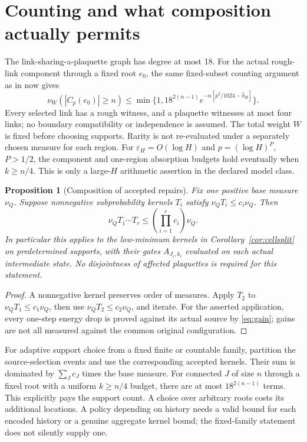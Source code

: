 \documentclass[11pt]{article}
\newtheorem{proposition}[theorem]{Proposition}
\theoremstyle{definition}
\theoremstyle{remark}
\begin{document}
\section{Counting and what composition actually permits}
The link-sharing-a-plaquette graph has degree at most 18. For the actual
rough-link component through a fixed root $e_0$, the same fixed-subset
counting argument as in \cite{third} now gives
\begin{equation}
 \nu_W(|C_p(e_0)|\ge n)
 \le\min\{1,18^{2(n-1)}e^{-n[p^2/1024-\widehat b_H]}\}.
 \label{eq:components}
\end{equation}
Every selected link has a rough witness, and a plaquette witnesses at
most four links; no boundary compatibility or independence is assumed.
The total weight $W$ is fixed before choosing supports. Rarity is not
re-evaluated under a separately chosen measure for each region.
For $\varepsilon_H=O(\log H)$ and $p=(\log H)^P$, $P>1/2$, the component
and one-region absorption budgets hold eventually when $k\ge n/4$.
This is only a large-$H$ arithmetic assertion in the declared model class.

\begin{proposition}[Composition of accepted repairs]\label{prop:composition}
Fix one positive base measure $\nu_Q$. Suppose nonnegative
subprobability kernels $T_i$ satisfy
$\nu_QT_i\le c_i\nu_Q$. Then
\begin{equation}
 \nu_QT_1\cdots T_r\le\left(\prod_{i=1}^r c_i\right)\nu_Q.
 \label{eq:composition}
\end{equation}
In particular this applies to the low-minimum kernels in
Corollary~\ref{cor:cellsplit} on predetermined supports, with their gates
$A_{J_i,k_i}$ evaluated on each \emph{actual intermediate state}.
No disjointness of affected plaquettes is required for this statement.
\end{proposition}
\begin{proof}
A nonnegative kernel preserves order of measures. Apply $T_2$ to
$\nu_QT_1\le c_1\nu_Q$, then use $\nu_QT_2\le c_2\nu_Q$, and iterate.
For the asserted application, every one-step energy drop is proved
against its actual source by \eqref{eq:gain}; gains are not all measured
against the common original configuration.
\end{proof}
For adaptive support choice from a fixed finite or countable family,
partition the source-selection events and use the corresponding accepted
kernels. Their sum is dominated by $\sum_Jc_J$ times the base measure.
For connected $J$ of size $n$ through a fixed root with a uniform
$k\ge n/4$ budget, there are at most $18^{2(n-1)}$ terms. This explicitly
pays the support count. A choice over arbitrary roots costs its additional
locations. A policy depending on history needs a valid bound for each
encoded history or a genuine aggregate kernel bound; the fixed-family
statement does not silently supply one.
\end{document}
